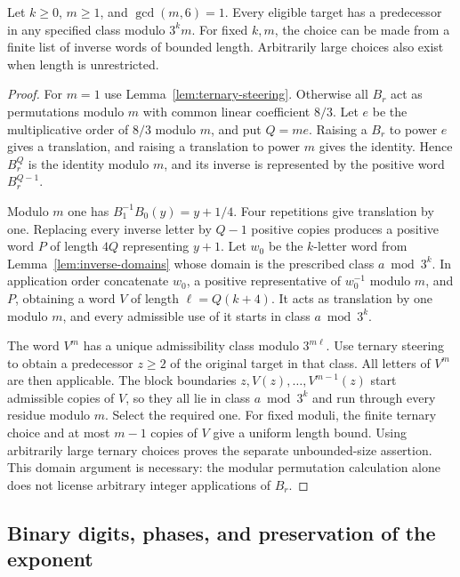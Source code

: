 \begin{lemma}\label{lem:odd-steering}
Let $k\ge0$, $m\ge1$, and $\gcd(m,6)=1$. Every eligible target has a
predecessor in any specified class modulo $3^km$. For fixed $k,m$, the
choice can be made from a finite list of inverse words of bounded length.
Arbitrarily large choices also exist when length is unrestricted.
\end{lemma}
\begin{proof}
For $m=1$ use Lemma~\ref{lem:ternary-steering}. Otherwise all $B_r$ act as
permutations modulo $m$ with common linear coefficient $8/3$. Let $e$ be
the multiplicative order of $8/3$ modulo $m$, and put $Q=me$. Raising a
$B_r$ to power $e$ gives a translation, and raising a translation to power
$m$ gives the identity. Hence $B_r^Q$ is the identity modulo $m$, and its
inverse is represented by the positive word $B_r^{Q-1}$.

Modulo $m$ one has $B_1^{-1}B_0(y)=y+1/4$. Four repetitions give
translation by one. Replacing every inverse letter by $Q-1$ positive
copies produces a positive word $P$ of length $4Q$ representing $y+1$.
Let $w_0$ be the $k$-letter word from Lemma~\ref{lem:inverse-domains}
whose domain is the prescribed class $a\bmod3^k$. In application order
concatenate $w_0$, a positive representative of $w_0^{-1}$ modulo $m$,
and $P$, obtaining a word $V$ of length $\ell=Q(k+4)$.
It acts as translation by one modulo $m$, and every admissible use of it
starts in class $a\bmod3^k$.

The word $V^m$ has a unique admissibility class modulo $3^{m\ell}$.
Use ternary steering to obtain a predecessor $z\ge2$ of the original
target in that class. All letters of $V^m$ are then applicable.
The block boundaries $z,V(z),\ldots,V^{m-1}(z)$ start admissible copies
of $V$, so they all lie in class $a\bmod3^k$ and run through every
residue modulo $m$. Select the required one. For fixed moduli, the finite
ternary choice and at most $m-1$ copies of $V$ give a uniform length bound.
Using arbitrarily large ternary choices proves the separate unbounded-size
assertion. This domain argument is necessary: the modular permutation
calculation alone does not license arbitrary integer applications of $B_r$.
\end{proof}

\subsection{Binary digits, phases, and preservation of the exponent}

